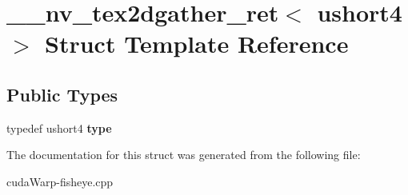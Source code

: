 \hypertarget{struct____nv__tex2dgather__ret_3_01ushort4_01_4}{}\section{\+\_\+\+\_\+nv\+\_\+tex2dgather\+\_\+ret$<$ ushort4 $>$ Struct Template Reference}
\label{struct____nv__tex2dgather__ret_3_01ushort4_01_4}
\subsection*{Public Types}
\begin{DoxyCompactItemize}
\item 
typedef ushort4 {\bfseries type}\hypertarget{struct____nv__tex2dgather__ret_3_01ushort4_01_4_add52b8b25b895d17c846c4fa893b22c1}{}\label{struct____nv__tex2dgather__ret_3_01ushort4_01_4_add52b8b25b895d17c846c4fa893b22c1}

\end{DoxyCompactItemize}


The documentation for this struct was generated from the following file\+:\begin{DoxyCompactItemize}
\item 
cuda\+Warp-\/fisheye.\+cpp\end{DoxyCompactItemize}
